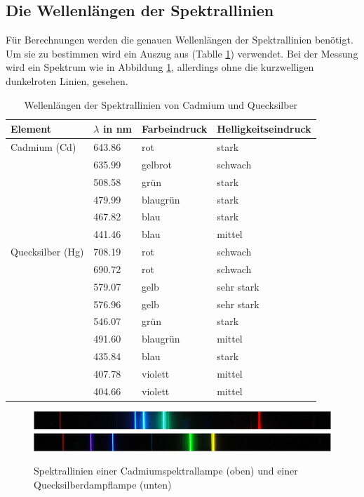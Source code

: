 \subsection{Die Wellenlängen der Spektrallinien}
Für Berechnungen werden die genauen Wellenlängen der Spektrallinien benötigt. Um sie zu bestimmen wird ein Auszug aus \cite[Tabellenanhang Tab. A 4.3]{Walcher} (Tablle \ref{tab:Wellenlange}) verwendet. Bei der Messung wird ein Spektrum wie in Abbildung \ref{abb:Spektrum}, allerdings ohne die kurzwelligen dunkelroten Linien, gesehen.
\begin{table}[h!]
	\centering
	\begin{tabular}{llll}
		Element & $\lambda$ in \si{\nano\meter} & Farbeindruck & Helligkeitseindruck\footnotemark \\
		\hline
		Cadmium (Cd) & 643.86 & rot & stark \\
		& 635.99 & gelbrot & schwach \\
		& 508.58 & grün & stark \\
		& 479.99 & blaugrün & stark \\
		& 467.82 & blau & stark \\
		& 441.46 & blau & mittel \\
		\hline
		Quecksilber (Hg) & 708.19 & rot & schwach \\
		& 690.72 & rot & schwach \\
		& 579.07 & gelb & sehr stark \\
		& 576.96 & gelb & sehr stark \\
		& 546.07 & grün & stark \\
		& 491.60 & blaugrün & mittel \\
		& 435.84 & blau & stark \\
		& 407.78 & violett & mittel \\
		& 404.66 & violett & mittel \\
		\hline
	\end{tabular}
	\caption{Wellenlängen der Spektrallinien von Cadmium und Quecksilber}
	\label{tab:Wellenlange}
\end{table}
\begin{figure}[h!]
	\centering
	\includegraphics[width = \textwidth]{Cd.jpg}
	\includegraphics[width = \textwidth]{Hg.jpg}
	\caption{Spektrallinien einer Cadmiumspektrallampe \cite{Cadmium} (oben) und einer Quecksilberdampflampe \cite{Quecksilber} (unten)}
	\label{abb:Spektrum}
\end{figure}\newline
